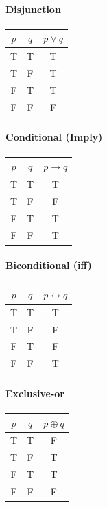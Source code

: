 \paragraph{Disjunction}
\begin{center}
\begin{tabular}{cc|c}
\toprule
$p$ & $q$ & $p \vee q$ \\
\midrule
T & T & T \\
T & F & T \\
F & T & T \\
F & F & F \\
\bottomrule
\end{tabular}
\end{center}

\paragraph{Conditional (Imply)}
\begin{center}
\begin{tabular}{cc|c}
\toprule
$p$ & $q$ & $p \to q$ \\
\midrule
T & T & T \\
T & F & F \\
F & T & T \\
F & F & T \\
\bottomrule
\end{tabular}
\end{center}

\paragraph{Biconditional (iff)}
\begin{center}
\begin{tabular}{cc|c}
\toprule
$p$ & $q$ & $p \leftrightarrow q$ \\
\midrule
T & T & T \\
T & F & F \\
F & T & F \\
F & F & T \\
\bottomrule
\end{tabular}
\end{center}

\paragraph{Exclusive-or}
\begin{center}
\begin{tabular}{cc|c}
\toprule
$p$ & $q$ & $p \oplus q$ \\
\midrule
T & T & F \\
T & F & T \\
F & T & T \\
F & F & F \\
\bottomrule
\end{tabular}
\end{center}

